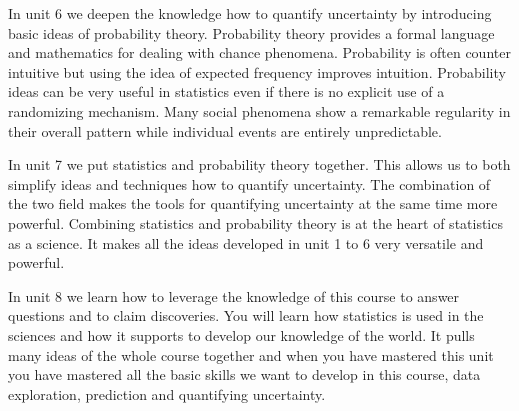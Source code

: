\documentclass[
  letterpaper,
]{scrbook}
\begin{document}
\begin{tcolorbox}
\begin{tcolorbox}[enhanced jigsaw, toprule=.15mm, colbacktitle=quarto-callout-note-color!10!white, breakable, coltitle=black, rightrule=.15mm, bottomtitle=1mm, bottomrule=.15mm, titlerule=0mm, title=\textcolor{quarto-callout-note-color}{\faInfo}\hspace{0.5em}{Unit 6: Probability: Quantifying uncertainty and variability}, arc=.35mm, leftrule=.75mm, toptitle=1mm, left=2mm, opacityback=0, opacitybacktitle=0.6, colframe=quarto-callout-note-color-frame, colback=white]
In unit 6 we deepen the knowledge how to quantify uncertainty by
introducing basic ideas of probability theory. Probability theory
provides a formal language and mathematics for dealing with chance
phenomena. Probability is often counter intuitive but using the idea of
expected frequency improves intuition. Probability ideas can be very
useful in statistics even if there is no explicit use of a randomizing
mechanism. Many social phenomena show a remarkable regularity in their
overall pattern while individual events are entirely unpredictable.
\end{tcolorbox}

\begin{tcolorbox}[enhanced jigsaw, toprule=.15mm, colbacktitle=quarto-callout-note-color!10!white, breakable, coltitle=black, rightrule=.15mm, bottomtitle=1mm, bottomrule=.15mm, titlerule=0mm, title=\textcolor{quarto-callout-note-color}{\faInfo}\hspace{0.5em}{Unit 7: Putting Probability and Statistics together}, arc=.35mm, leftrule=.75mm, toptitle=1mm, left=2mm, opacityback=0, opacitybacktitle=0.6, colframe=quarto-callout-note-color-frame, colback=white]
In unit 7 we put statistics and probability theory together. This allows
us to both simplify ideas and techniques how to quantify uncertainty.
The combination of the two field makes the tools for quantifying
uncertainty at the same time more powerful. Combining statistics and
probability theory is at the heart of statistics as a science. It makes
all the ideas developed in unit 1 to 6 very versatile and powerful.
\end{tcolorbox}

\begin{tcolorbox}[enhanced jigsaw, toprule=.15mm, colbacktitle=quarto-callout-note-color!10!white, breakable, coltitle=black, rightrule=.15mm, bottomtitle=1mm, bottomrule=.15mm, titlerule=0mm, title=\textcolor{quarto-callout-note-color}{\faInfo}\hspace{0.5em}{Unit 8: Answering questions and claiming discoveries}, arc=.35mm, leftrule=.75mm, toptitle=1mm, left=2mm, opacityback=0, opacitybacktitle=0.6, colframe=quarto-callout-note-color-frame, colback=white]
In unit 8 we learn how to leverage the knowledge of this course to
answer questions and to claim discoveries. You will learn how statistics
is used in the sciences and how it supports to develop our knowledge of
the world. It pulls many ideas of the whole course together and when you
have mastered this unit you have mastered all the basic skills we want
to develop in this course, data exploration, prediction and quantifying
uncertainty.
\end{tcolorbox}


\end{tcolorbox}
\end{document}
